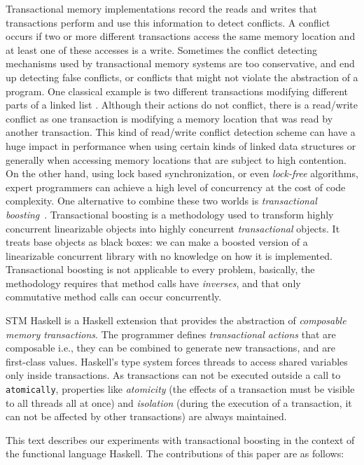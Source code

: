\documentclass{llncs}
\begin{document}
Transactional memory implementations record the reads and writes that 
transactions perform and use this information to detect 
conflicts. A conflict occurs if two or more different transactions access the same memory
location and at least one of these accesses is a write.
Sometimes the conflict detecting mechanisms used by transactional memory systems 
are too conservative, and
end up detecting false conflicts, or conflicts that might not violate
the abstraction of a program. One classical example is two different
transactions modifying different parts of a linked list \cite{linkedlist,tboosting,unreadtvar,opennesting}. Although their actions
do not conflict, there is a read/write conflict as one transaction is
modifying a memory location that was read by another transaction. 
This kind
of read/write conflict detection scheme can have a huge impact in performance when
using certain kinds of linked data structures or generally when 
accessing memory locations that are subject to
high contention. 
On the other hand, using lock based synchronization, or even
{\it lock-free} algorithms, expert programmers can achieve
a high level of concurrency at the cost of code complexity. 
One alternative to combine these two worlds is {\it transactional boosting}~\cite{tboosting}.
Transactional boosting is a methodology used to transform highly
concurrent linearizable objects into highly concurrent {\it transactional}
objects. It treats base objects as black boxes: we can make
a boosted version of a linearizable concurrent library with no knowledge on how
it is implemented. Transactional boosting is not applicable to every problem,
basically, the methodology requires that method calls have {\it inverses}, and
that only commutative method calls can occur concurrently. 


 STM Haskell \cite{stmhaskell} is a Haskell extension that provides the
abstraction of 
{\it composable memory transactions}. The programmer defines
{\it transactional actions} that are composable i.e., they can be combined
to generate new transactions, and are first-class values.
Haskell's type system forces threads to access shared variables only inside transactions.
As transactions can not be executed outside
a call to {\tt atomically}, properties like {\it atomicity} (the effects
of a transaction must be visible to all threads all at once) and 
{\it isolation} (during the execution of a transaction, it can not be affected by
other transactions) are always maintained. 

This text describes our experiments with transactional boosting in the context
of the functional language Haskell. The contributions of this paper
are as follows:
\end{document}
